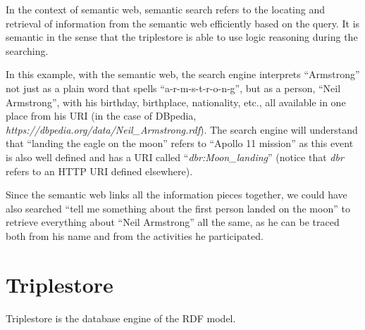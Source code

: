In the context of semantic web, semantic search refers to the locating and retrieval of information from the semantic web efficiently based on the query. It is semantic in the sense that the triplestore is able to use logic reasoning during the searching.

In this example, with the semantic web, the search engine interprets ``Armstrong'' not just as a plain word that spells ``a-r-m-s-t-r-o-n-g'', but as a person, ``Neil Armstrong'', with his birthday, birthplace, nationality, etc., all available in one place from his URI (in the case of DBpedia, \textit{https://dbpedia.org/data/Neil\_Armstrong.rdf}). The search engine will understand that ``landing the eagle on the moon'' refers to ``Apollo 11 mission'' as this event is also well defined and has a URI called ``\textit{dbr:Moon\_landing}'' (notice that \textit{dbr} refers to an HTTP URI defined elsewhere). 

Since the semantic web links all the information pieces together, we could have also searched ``tell me something about the first person landed on the moon'' to retrieve everything about ``Neil Armstrong'' all the same, as he can be traced both from his name and from the activities he participated.


















\section{Triplestore}

Triplestore is the database engine of the RDF model. 

